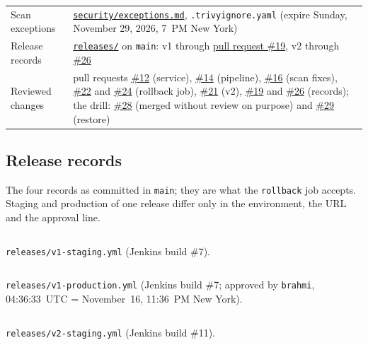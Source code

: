 \begin{tabularx}{\linewidth}{L{4.2cm}Y}
Scan exceptions & \href{\GiteaRepoURL/src/commit/06550eb4fe5d3315b31e1a1bd2fe1b4f034af77f/security/exceptions.md}{\texttt{security/exceptions.md}}, \texttt{.trivyignore.yaml} (expire Sunday, November 29, 2026, 7~PM New York)\\
Release records & \href{\GiteaRepoURL/src/branch/main/releases}{\texttt{releases/}} on \texttt{main}: v1 through \href{\GiteaRepoURL/pulls/19}{pull request \#19}, v2 through \href{\GiteaRepoURL/pulls/26}{\#26}\\
Reviewed changes & pull requests \href{\GiteaRepoURL/pulls/12}{\#12} (service), \href{\GiteaRepoURL/pulls/14}{\#14} (pipeline), \href{\GiteaRepoURL/pulls/16}{\#16} (scan fixes), \href{\GiteaRepoURL/pulls/22}{\#22} and \href{\GiteaRepoURL/pulls/24}{\#24} (rollback job), \href{\GiteaRepoURL/pulls/21}{\#21} (v2), \href{\GiteaRepoURL/pulls/19}{\#19} and \href{\GiteaRepoURL/pulls/26}{\#26} (records); the drill: \href{\GiteaRepoURL/pulls/28}{\#28} (merged without review on purpose) and \href{\GiteaRepoURL/pulls/29}{\#29} (restore)\\
\end{tabularx}

\subsection{Release records}\label{Section:deliveryRecords}
The four records as committed in \texttt{main}; they are what the \texttt{rollback} job accepts. Staging and production of one release differ only in the environment, the URL and the approval line.

\begin{longlisting}
\inputminted[fontsize=\scriptsize]{yaml}{config/twintrack/releases/v1-staging.yml}
\caption{\texttt{releases/v1-staging.yml} (Jenkins build \#7).}
\label{Listing:EDeliveryRecV1S}
\end{longlisting}

\begin{longlisting}
\inputminted[fontsize=\scriptsize]{yaml}{config/twintrack/releases/v1-production.yml}
\caption{\texttt{releases/v1-production.yml} (Jenkins build \#7; approved by \texttt{brahmi}, 04:36:33~UTC = November~16, 11:36~PM New York).}
\label{Listing:EDeliveryRecV1P}
\end{longlisting}

\begin{longlisting}
\inputminted[fontsize=\scriptsize]{yaml}{config/twintrack/releases/v2-staging.yml}
\caption{\texttt{releases/v2-staging.yml} (Jenkins build \#11).}
\label{Listing:EDeliveryRecV2S}
\end{longlisting}

